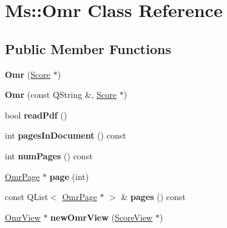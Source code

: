 \hypertarget{class_ms_1_1_omr}{}\section{Ms\+:\+:Omr Class Reference}
\label{class_ms_1_1_omr}
\subsection*{Public Member Functions}
\begin{DoxyCompactItemize}
\item 
\mbox{\label{class_ms_1_1_omr_a87ca9bf0905aa1b5ffa23c6be4b5e5e2}} 
{\bfseries Omr} (\hyperlink{class_ms_1_1_score}{Score} $\ast$)
\item 
\mbox{\label{class_ms_1_1_omr_a203bcfb145d9f736ca7c771289b2044e}} 
{\bfseries Omr} (const Q\+String \&, \hyperlink{class_ms_1_1_score}{Score} $\ast$)
\item 
\mbox{\label{class_ms_1_1_omr_a7c9cdebfb967ce6f214900140b4a3b5f}} 
bool {\bfseries read\+Pdf} ()
\item 
\mbox{\label{class_ms_1_1_omr_a7d3859e158afdcd64f09daa0655f7e57}} 
int {\bfseries pages\+In\+Document} () const
\item 
\mbox{\label{class_ms_1_1_omr_a52639463308b0bdb5b044befdbfd08bf}} 
int {\bfseries num\+Pages} () const
\item 
\mbox{\label{class_ms_1_1_omr_ad3398486aac905d3a229189d6fee7298}} 
\hyperlink{class_ms_1_1_omr_page}{Omr\+Page} $\ast$ {\bfseries page} (int)
\item 
\mbox{\label{class_ms_1_1_omr_a9c133533ccda9cb3ad0e0f86e7c277a4}} 
const Q\+List$<$ \hyperlink{class_ms_1_1_omr_page}{Omr\+Page} $\ast$ $>$ \& {\bfseries pages} () const
\item 
\mbox{\label{class_ms_1_1_omr_a7bf6135d63dda2dc397ca0572fd4c7db}} 
\hyperlink{class_ms_1_1_omr_view}{Omr\+View} $\ast$ {\bfseries new\+Omr\+View} (\hyperlink{class_ms_1_1_score_view}{Score\+View} $\ast$)
\item 
\mbox{\label{class_ms_1_1_omr_a209963175d8514fd5c03ce9a13f62767}} 

\end{DoxyCompactItemize}
